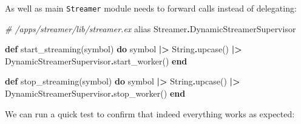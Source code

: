\documentclass[
  oneside]{book}
\newenvironment{Shaded}{\begin{snugshade}}{\end{snugshade}}
\newcommand{\CommentTok}[1]{\textcolor[rgb]{0.56,0.35,0.01}{\textit{#1}}}
\newcommand{\ConstantTok}[1]{\textcolor[rgb]{0.00,0.00,0.00}{#1}}
\newcommand{\ImportTok}[1]{#1}
\newcommand{\KeywordTok}[1]{\textcolor[rgb]{0.13,0.29,0.53}{\textbf{#1}}}
\newcommand{\NormalTok}[1]{#1}
\newcommand{\OperatorTok}[1]{\textcolor[rgb]{0.81,0.36,0.00}{\textbf{#1}}}
\begin{document}
As well as main \texttt{Streamer} module needs to forward calls instead of delegating:

\begin{Shaded}
\begin{Highlighting}[]
  \CommentTok{\# /apps/streamer/lib/streamer.ex}
  \ImportTok{alias} \ConstantTok{Streamer}\OperatorTok{.}\ConstantTok{DynamicStreamerSupervisor}

  \KeywordTok{def}\NormalTok{ start\_streaming(symbol) }\KeywordTok{do}
\NormalTok{    symbol}
    \OperatorTok{|\textgreater{}} \ConstantTok{String}\OperatorTok{.}\NormalTok{upcase()}
    \OperatorTok{|\textgreater{}} \ConstantTok{DynamicStreamerSupervisor}\OperatorTok{.}\NormalTok{start\_worker()}
  \KeywordTok{end}

  \KeywordTok{def}\NormalTok{ stop\_streaming(symbol) }\KeywordTok{do}
\NormalTok{    symbol}
    \OperatorTok{|\textgreater{}} \ConstantTok{String}\OperatorTok{.}\NormalTok{upcase()}
    \OperatorTok{|\textgreater{}} \ConstantTok{DynamicStreamerSupervisor}\OperatorTok{.}\NormalTok{stop\_worker()}
  \KeywordTok{end}
\end{Highlighting}
\end{Shaded}

We can run a quick test to confirm that indeed everything works as expected:
\end{document}
